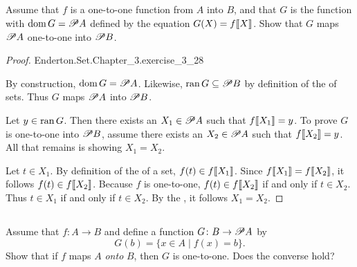 \documentclass{report}
\begin{document}
\subsection{}%
\label{sub:exercise-3.28}

Assume that $f$ is a one-to-one function from $A$ into $B$, and that $G$ is the
  function with $\mathop{\text{dom}}{G} = \mathscr{P}A$ defined by the equation
  $G(X) = f\!\left\llbracket X\right\rrbracket$.
Show that $G$ maps $\mathscr{P}A$ one-to-one into $\mathscr{P}B$.

\begin{proof}

    {Enderton.Set.Chapter\_3.exercise\_3\_28}

  By construction, $\mathop{\text{dom}}{G} = \mathscr{P}A$.
  Likewise, $\mathop{\text{ran}}{G} \subseteq \mathscr{P}B$ by definition of the
     of sets.
  Thus $G$ maps $\mathscr{P}A$ into $\mathscr{P}B$.

  Let $y \in \mathop{\text{ran}}{G}$.
  Then there exists an $X_1 \in \mathscr{P}A$ such that $f\!\left\llbracket X_1\right\rrbracket = y$.
  To prove $G$ is one-to-one into $\mathscr{P}B$, assume there exists an
    $X_2 \in \mathscr{P}A$ such that $f\!\left\llbracket X_2\right\rrbracket = y$.
  All that remains is showing $X_1 = X_2$.

  Let $t \in X_1$.
  By definition of the  of a set, $f(t) \in f\!\left\llbracket X_1\right\rrbracket$.
  Since $f\!\left\llbracket X_1\right\rrbracket = f\!\left\llbracket X_2\right\rrbracket$, it follows $f(t) \in f\!\left\llbracket X_2\right\rrbracket$.
  Because $f$ is one-to-one, $f(t) \in f\!\left\llbracket X_2\right\rrbracket$ if and only if $t \in X_2$.
  Thus $t \in X_1$ if and only if $t \in X_2$.
  By the , it follows $X_1 = X_2$.

\end{proof}

\subsection{}%
\label{sub:exercise-3.29}

Assume that $f \colon A \rightarrow B$ and define a function
  $G \colon B \rightarrow \mathscr{P}A$ by
  \begin{equation}
    \label{sub:exercise-3.29-eq1}
    G(b) = \{x \in A \mid f(x) = b\}.
  \end{equation}
Show that if $f$ maps $A$ \textit{onto} $B$, then $G$ is one-to-one.
Does the converse hold?
\end{document}

